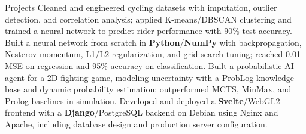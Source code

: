 \begin{rubric}{Projects}
%
%
\entry* Cleaned and engineered cycling datasets with imputation, outlier detection, and correlation analysis; applied K-means/DBSCAN clustering and trained a neural network to predict rider performance with 90\% test accuracy.
% 
%
\entry* Built a neural network from scratch in \textbf{Python}/\textbf{NumPy} with backpropagation, Nesterov momentum, L1/L2 regularization, and grid-search tuning; reached 0.01 MSE on regression and 95\% accuracy on classification.
%
\entry* Built a probabilistic AI agent for a 2D fighting game, modeling uncertainty with a ProbLog knowledge base and dynamic probability estimation; outperformed MCTS, MinMax, and Prolog baselines in simulation.
%
\entry* Developed and deployed a \textbf{Svelte}/WebGL2 frontend with a \textbf{Django}/PostgreSQL backend on Debian using Nginx and Apache, including database design and production server configuration.
%
\end{rubric}
